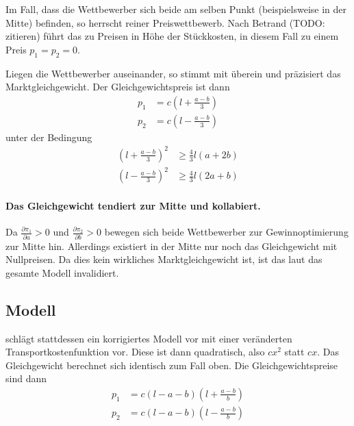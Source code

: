 Im Fall, dass die Wettbewerber sich beide am selben Punkt (beispielsweise in der Mitte) befinden, so herrscht reiner Preiswettbewerb. Nach Betrand (TODO: zitieren) führt das zu Preisen in Höhe der Stückkosten, in diesem Fall zu einem Preis $p_1=p_2=0$.

Liegen die Wettbewerber auseinander, so stimmt \cite{aspremont1979} mit \cite{hotelling1929} überein und präzisiert das Marktgleichgewicht. Der Gleichgewichtspreis ist dann
\begin{equation}
\begin{split}
p_1 &= c \left(l+\frac{a-b}{3}\right) \\
p_2 &= c \left(l-\frac{a-b}{3}\right)
\end{split}
\end{equation}
unter der Bedingung
\begin{equation}
\begin{split}
\left(l+\frac{a-b}{3}\right)^2 &\geq \tfrac{4}{3} l (a+2b) \\
\left(l-\frac{a-b}{3}\right)^2 &\geq \tfrac{4}{3} l (2a+b)
\end{split}
\end{equation}

\paragraph{Das Gleichgewicht tendiert zur Mitte und kollabiert.} Da $\frac{\partial \pi_1}{\partial a}>0$ und $\frac{\partial \pi_2}{\partial b}>0$ bewegen sich beide Wettbewerber zur Gewinnoptimierung zur Mitte hin. Allerdings existiert in der Mitte nur noch das Gleichgewicht mit Nullpreisen. Da dies kein wirkliches Marktgleichgewicht ist, ist das laut \cite{aspremont1979} das gesamte Modell invalidiert.

\subsection{Modell}\label{Sec-Aspremont-Modell}
\cite{aspremont1979} schlägt stattdessen ein korrigiertes Modell vor mit einer veränderten Transportkostenfunktion vor. Diese ist dann quadratisch, also $cx^2$ statt $cx$.
Das Gleichgewicht berechnet sich identisch zum Fall oben. Die Gleichgewichtspreise sind dann
\begin{equation}
\begin{split}
p_1 &= c (l-a-b) \left(l+\frac{a-b}{b}\right) \\
p_2 &= c (l-a-b) \left(l-\frac{a-b}{b}\right)
\end{split}
\end{equation}

